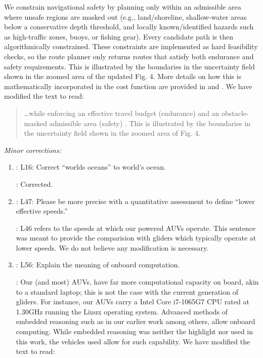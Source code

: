 \documentclass[a4paper]{article}
\begin{document}
\begin{answers}
\begin{enumerate}
  We constrain navigational safety by planning only within an
  admissible area where unsafe regions are masked out (e.g.,
  land/shoreline, shallow-water areas below a conservative depth
  threshold, and locally known/identified hazards such as high-traffic
  zones, buoys, or fishing gear). Every candidate path is then
  algorithmically constrained. These constraints are implemented as
  hard feasibility checks, so the route planner only returns routes
  that satisfy both endurance and safety requirements. This is
  illustrated by the boundaries in the uncertainty field shown in the
  zoomed area of the updated Fig. 4. More details on how this is
  mathematically incorporated in the cost function are provided in
  \cite{bernacchi2025} and \cite{bernacchi26}. We have modified the
  text to read:

     \begin{quote}

       \ldots while enforcing an effective travel budget (endurance)
       and an obstacle-masked admissible area (safety)
       \cite{bernacchi2025}. This is illustrated by the boundaries in
       the uncertainty field shown in the zoomed area of Fig. 4.

    \end{quote}

\end{enumerate}


\item{\it Minor corrections:}\label{sec:r1-minor}

  \begin{enumerate}
    
  \item
    \reply: L16: Correct “worlds oceans” to world’s ocean.
    
    \action: Corrected.

  \item \reply: L47: Please be more precise with a quantitative
    assessment to define “lower effective speeds.”
    
    \action: L46 refers to the speeds at which our powered AUVs operate.
    This sentence was meant to provide the comparision with gliders
    which typically operate at lower speeds. We do not believe any
    modification is necessary. 

  \item \label{sec:r1-compute} \reply: L56: Explain the meaning of onboard computation.
    
    \action: Our (and most) AUVs, have far more computational capacity
    on board, akin to a standard laptop; this is not the case with the
    current generation of gliders. For instance, our AUVs carry a
    Intel Core i7-1065G7 CPU rated at 1.30GHz running the Linux
    operating system. Advanced methods of embedded reasoning such as
    in our earlier work
    \cite{das11b,rajan12,chrpa15,fossum18,fossum19,fossum19b} among
    others, allow onboard computing. While embedded reasoning was
    neither the highlight nor used in this work, the vehicles used
    allow for such capability. We have modified the text to read:


\end{enumerate}
\end{answers}
\end{document}
